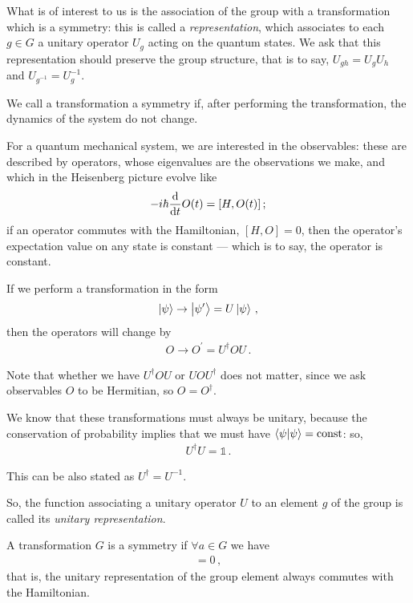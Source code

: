 \documentclass[main.tex]{subfiles}
\begin{document}
What is of interest to us is the association of the group with a transformation which is a symmetry: this is called a \emph{representation}, which associates to each \(g \in G\) a unitary operator \(U_g\) acting on the quantum states. We ask that this representation should preserve the group structure, that is to say, \(U_{gh} = U_g U_h\) and \(U_{g^{-1}} = U_{g}^{-1}\).

We call a transformation a symmetry if, after performing the transformation, the dynamics of the system do not change. 

For a quantum mechanical system, we are interested in the observables: these are described by operators, whose eigenvalues are the observations we make, and which in the Heisenberg picture evolve like 
%
\begin{align}
- i \hbar \dv{}{t} O(t) = [H, O(t)]
\,;
\end{align}
%
if an operator commutes with the Hamiltonian, \([H,O]=0\), then the operator's expectation value on any state is constant --- which is to say, the operator is constant. 

If we perform a transformation in the form 
%
\begin{align}
\ket{\psi } \rightarrow \ket{\psi'} = U \ket{\psi }
\,,
\end{align}
%
then the operators will change by 
%
\begin{align}
O \rightarrow O^{\prime } = U ^\dag O U 
\,.
\end{align}

Note that whether we have \(U ^\dag O U\) or \(U O U ^\dag\) does not matter, since we ask observables \(O\) to be Hermitian, so \(O = O ^\dag\). 

We know that these transformations must always be unitary, because the conservation of probability implies that we must have \(\braket{\psi }{\psi } = \text{const}\): so, 
%
\begin{align}
U ^\dag U = \mathbb{1}
\,.
\end{align}

This can be also stated as \(U ^\dag = U^{-1}\). 

So, the function associating a unitary operator \(U\) to an element \(g\) of the group is called its \emph{unitary representation}. 

A transformation \(G\) is a symmetry if \(\forall a \in G\) we have 
%
\begin{align}
[U(a), H]  =0
\,,
\end{align}
%
that is, the unitary representation of the group element always commutes with the Hamiltonian.
\end{document}
